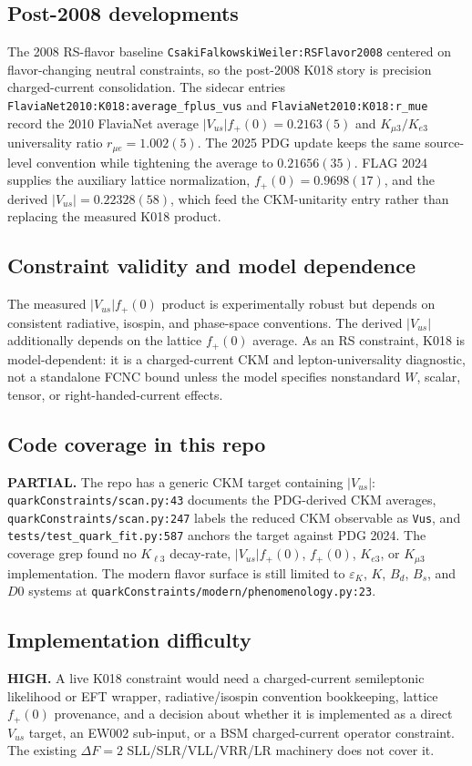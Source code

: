 \subsection*{Post-2008 developments}
The 2008 RS-flavor baseline \texttt{CsakiFalkowskiWeiler:RSFlavor2008}
centered on flavor-changing neutral constraints, so the post-2008 K018 story
is precision charged-current consolidation.  The sidecar entries
\texttt{FlaviaNet2010:K018:average\_fplus\_vus} and
\texttt{FlaviaNet2010:K018:r\_mue} record the 2010 FlaviaNet average
\(|V_{us}|f_+(0)=0.2163(5)\) and \(K_{\mu3}/K_{e3}\) universality ratio
\(r_{\mu e}=1.002(5)\).  The 2025 PDG update keeps the same source-level
convention while tightening the average to \(0.21656(35)\).  FLAG 2024 supplies
the auxiliary lattice normalization, \(f_+(0)=0.9698(17)\), and the derived
\(|V_{us}|=0.22328(58)\), which feed the CKM-unitarity entry rather than
replacing the measured K018 product.

\subsection*{Constraint validity and model dependence}
The measured \(|V_{us}|f_+(0)\) product is experimentally robust but depends
on consistent radiative, isospin, and phase-space conventions.  The derived
\(|V_{us}|\) additionally depends on the lattice \(f_+(0)\) average.  As an
RS constraint, K018 is model-dependent: it is a charged-current CKM and
lepton-universality diagnostic, not a standalone FCNC bound unless the model
specifies nonstandard \(W\), scalar, tensor, or right-handed-current effects.

\subsection*{Code coverage in this repo}
\textbf{PARTIAL.}  The repo has a generic CKM target containing \(|V_{us}|\):
\texttt{quarkConstraints/scan.py:43} documents the PDG-derived CKM averages,
\texttt{quarkConstraints/scan.py:247} labels the reduced CKM observable as
\texttt{Vus}, and \texttt{tests/test\_quark\_fit.py:587} anchors the target
against PDG 2024.  The coverage grep found no \(K_{\ell3}\) decay-rate,
\(|V_{us}|f_+(0)\), \(f_+(0)\), \(K_{e3}\), or \(K_{\mu3}\) implementation.
The modern flavor surface is still limited to \(\varepsilon_K\), \(K\),
\(B_d\), \(B_s\), and \(D0\) systems at
\texttt{quarkConstraints/modern/phenomenology.py:23}.

\subsection*{Implementation difficulty}
\textbf{HIGH.}  A live K018 constraint would need a charged-current
semileptonic likelihood or EFT wrapper, radiative/isospin convention
bookkeeping, lattice \(f_+(0)\) provenance, and a decision about whether it is
implemented as a direct \(V_{us}\) target, an EW002 sub-input, or a BSM
charged-current operator constraint.  The existing \(\Delta F=2\)
SLL/SLR/VLL/VRR/LR machinery does not cover it.

